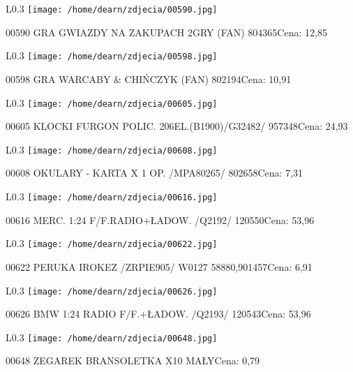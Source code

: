 \begin{wrapfigure}{L}{0.3\textwidth}
\texttt{[image: /home/dearn/zdjecia/00590.jpg]}
\end{wrapfigure}
00590 GRA GWIAZDY NA ZAKUPACH  2GRY    (FAN)          804365Cena: 12,85\newline
\begin{wrapfigure}{L}{0.3\textwidth}
\texttt{[image: /home/dearn/zdjecia/00598.jpg]}
\end{wrapfigure}
00598 GRA WARCABY & CHIŃCZYK       (FAN)              802194Cena: 10,91\newline
\begin{wrapfigure}{L}{0.3\textwidth}
\texttt{[image: /home/dearn/zdjecia/00605.jpg]}
\end{wrapfigure}
00605 KLOCKI FURGON POLIC. 206EL.(B1900)/G32482/      957348Cena: 24,93\newline
\begin{wrapfigure}{L}{0.3\textwidth}
\texttt{[image: /home/dearn/zdjecia/00608.jpg]}
\end{wrapfigure}
00608 OKULARY - KARTA X 1 OP. /MPA80265/              802658Cena: 7,31\newline
\begin{wrapfigure}{L}{0.3\textwidth}
\texttt{[image: /home/dearn/zdjecia/00616.jpg]}
\end{wrapfigure}
00616 MERC. 1:24 F/F.RADIO+ŁADOW.  /Q2192/            120550Cena: 53,96\newline
\begin{wrapfigure}{L}{0.3\textwidth}
\texttt{[image: /home/dearn/zdjecia/00622.jpg]}
\end{wrapfigure}
00622 PERUKA IROKEZ  /ZRPIE905/   W0127         58880,901457Cena: 6,91\newline
\begin{wrapfigure}{L}{0.3\textwidth}
\texttt{[image: /home/dearn/zdjecia/00626.jpg]}
\end{wrapfigure}
00626 BMW 1:24 RADIO F/F.+ŁADOW. /Q2193/              120543Cena: 53,96\newline
\begin{wrapfigure}{L}{0.3\textwidth}
\texttt{[image: /home/dearn/zdjecia/00648.jpg]}
\end{wrapfigure}
00648 ZEGAREK BRANSOLETKA  X10   MAŁYCena: 0,79\newline
